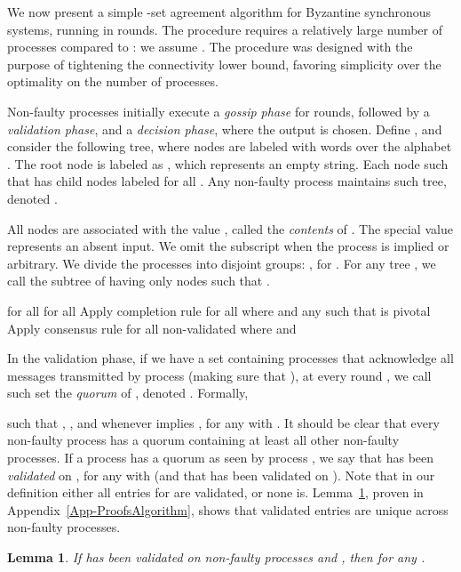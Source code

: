 \documentclass[11pt]{article}
\newtheorem{lemma}[theorem]{Lemma}
\begin{document}
We now present a simple -set agreement algorithm
for Byzantine synchronous systems,
running in  rounds.
The procedure requires a relatively large number of processes compared to :
we assume .
The procedure was designed 
with the purpose of tightening the connectivity lower bound,
favoring simplicity over the optimality on the number of processes.

Non-faulty processes initially execute a \emph{gossip phase}
for  rounds,
followed by a \emph{validation phase},
and a \emph{decision phase},
where the output is chosen.
Define ,
and consider the following tree,
where nodes are labeled with words over the alphabet .
The root node is labeled as ,
which represents an empty string.
Each node  such that 
has  child nodes labeled  for all .
Any non-faulty process  maintains such tree,
denoted .

All nodes  are associated with the value ,
called the \emph{contents} of .
The special value  represents an absent input.
We omit the subscript  when the process is implied or arbitrary.
We divide the processes into  disjoint groups: ,
for .
For any tree ,
we call  the subtree of  having only nodes  such that .

\begin{algorithm}[htb]
\caption{}
\label{Alg-Agree}
\begin{algorithmic}[1]
\If{}
	\State \Return 
\EndIf
\State  for all 
\State  {}
\For{}
	\State 
		\State  for all 
	\EndUpon
\EndFor \label{algAgree:gossip}
\State  {}
\If{}
	\State Apply completion rule for all  where  and 
\EndIf
\State  any  such that  is pivotal \label{algAgree:dec1} 
\For{}
	\State Apply consensus rule for all non-validated  where  and  \label{algAgree:dec2}
\EndFor
\State \Return 
\end{algorithmic}
\end{algorithm}

In the validation phase,
if we have a set  containing  processes that acknowledge
all messages transmitted by process  (making sure that ),
at every round ,
we call such set the \emph{quorum} of ,
denoted .
Formally,

such that ,
,
and  whenever  implies ,
for any  with .
It should be clear that every non-faulty process has a quorum containing at least
all other non-faulty processes.
If a process  has a quorum as seen by process ,
we say that  has been \emph{validated} on ,
for any  with 
(and that  has been validated on ).
Note that in our definition either all entries  for  are validated,
or none is.
Lemma~\ref{lemma-validated-identical},
proven in Appendix~\ref{App-ProofsAlgorithm},
shows that validated entries are unique across non-faulty processes.
\begin{lemma}
\label{lemma-validated-identical}
If  has been validated on non-faulty processes  and ,
then  for any .
\end{lemma}
\end{document}
